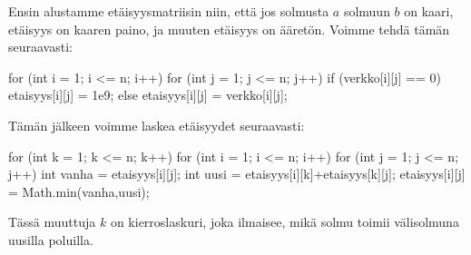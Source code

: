 Ensin alustamme etäisyysmatriisin niin,
että jos solmusta $a$ solmuun $b$ on kaari,
etäisyys on kaaren paino, ja muuten etäisyys on ääretön.
Voimme tehdä tämän seuraavasti:

\begin{code}
for (int i = 1; i <= n; i++) {
    for (int j = 1; j <= n; j++) {
        if (verkko[i][j] == 0) {
            etaisyys[i][j] = 1e9;
        } else {
            etaisyys[i][j] = verkko[i][j];
        }
    }
}
\end{code}

Tämän jälkeen voimme laskea etäisyydet seuraavasti:

\begin{code}
for (int k = 1; k <= n; k++) {
    for (int i = 1; i <= n; i++) {
        for (int j = 1; j <= n; j++) {
            int vanha = etaisyys[i][j];
            int uusi = etaisyys[i][k]+etaisyys[k][j];
            etaisyys[i][j] = Math.min(vanha,uusi);
        }
    }
}
\end{code}

Tässä muuttuja $k$ on kierroslaskuri, joka ilmaisee, mikä solmu toimii
välisolmuna uusilla poluilla.